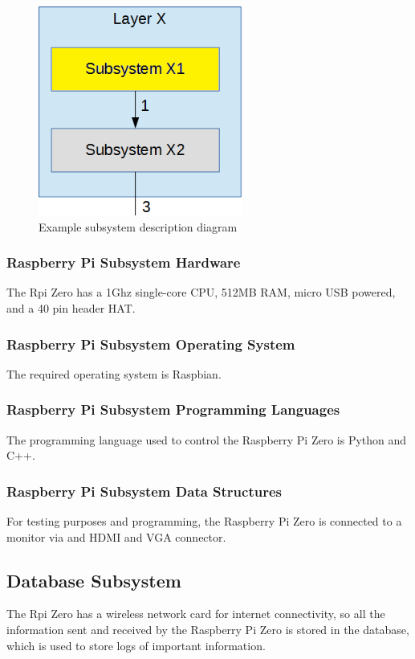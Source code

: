\begin{figure}[h!]
	\centering
 	\includegraphics[width=0.60\textwidth]{images/subsystem}
 \caption{Example subsystem description diagram}
\end{figure}

\subsubsection{Raspberry Pi Subsystem Hardware}
The Rpi Zero has a 1Ghz single-core CPU, 512MB RAM, micro USB powered, and a 40 pin header HAT.

\subsubsection{Raspberry Pi Subsystem Operating System}
The required operating system is Raspbian.


\subsubsection{Raspberry Pi Subsystem Programming Languages}
The programming language used to control the Raspberry Pi Zero is Python and C++.

\subsubsection{Raspberry Pi Subsystem Data Structures}
For testing purposes and programming, the Raspberry Pi Zero is connected to a monitor via and HDMI and VGA connector.



\subsection{Database Subsystem}
The Rpi Zero has a wireless network card for internet connectivity, so all the information sent and received by the Raspberry Pi Zero is stored in the database, which is used to store logs of important information.

